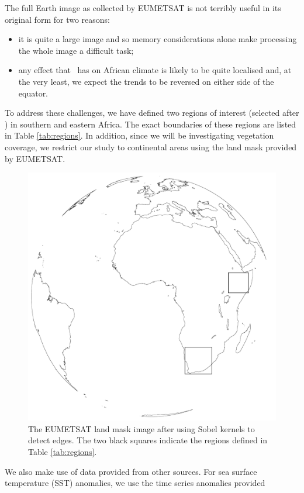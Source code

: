 The full Earth image as collected by EUMETSAT is not terribly useful
in its original form for two reasons:
\begin{itemize}
  \item{it is quite a large
    image and so memory considerations alone make processing the whole
    image a difficult task;}
  \item{any effect that \elnino\ has on African climate is likely to be
    quite localised and, at the very least, we expect the trends to be
    reversed on either side of the equator.}
\end{itemize}
To address these challenges, we have defined two regions of interest
(selected after \cite{anyamba1996, anyamba2002}) in southern and
eastern Africa. The exact boundaries of these regions are listed in
Table \ref{tab:regions}. In addition, since we will be investigating
vegetation coverage, we restrict our study to continental areas using
the land mask provided by EUMETSAT.
\begin{figure}
  \centering
  \label{fig:regions}
  \includegraphics[width=0.9\linewidth]{figures/regions_figure}
  \caption{The EUMETSAT land mask image after using Sobel kernels to
    detect edges. The two black squares indicate the regions defined
    in Table \ref{tab:regions}.}
\end{figure}
We also make use of data provided from other sources. For sea surface
temperature (SST) anomalies, we use the time series anomalies provided
